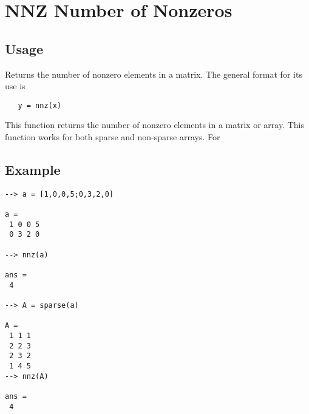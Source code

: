 \section{NNZ Number of Nonzeros}

\subsection{Usage}

Returns the number of nonzero elements in a matrix.
The general format for its use is
\begin{verbatim}
   y = nnz(x)
\end{verbatim}
This function returns the number of nonzero elements
in a matrix or array.  This function works for both
sparse and non-sparse arrays.  For 
\subsection{Example}

\begin{verbatim}
--> a = [1,0,0,5;0,3,2,0]

a = 
 1 0 0 5 
 0 3 2 0 

--> nnz(a)

ans = 
 4 

--> A = sparse(a)

A = 
 1 1 1
 2 2 3
 2 3 2
 1 4 5
--> nnz(A)

ans = 
 4 
\end{verbatim}
